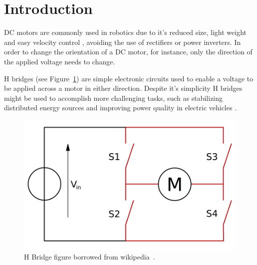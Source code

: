 \section{\textbf{Introduction}}\label{sec:1}
	DC motors are commonly used in robotics due to it's reduced size, light weight and easy velocity control , avoiding the use of rectifiers or power inverters. In order to change the orientation of a DC motor, for instance, only the direction of the applied voltage needs to change.

	H bridges (see Figure~\ref{fig:bridge}) are simple electronic circuits used to enable a voltage to be applied across a motor in either direction. Despite it's simplicity H bridges might be used to accomplish more challenging tasks, such as stabilizing distributed energy sources  and improving power quality in electric vehicles .

\begin{figure}[t]
\centering
	\centering%
	\includegraphics[height=.25\textwidth]{img/H_bridge.png}
	\caption{H Bridge figure borrowed from wikipedia~\cite{WIKI}.}\label{fig:bridge}%
\end{figure}


